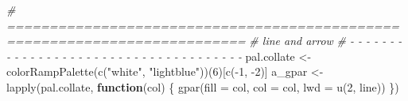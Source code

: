 \documentclass[
]{article}
\newenvironment{Shaded}{\begin{snugshade}}{\end{snugshade}}
\newcommand{\AttributeTok}[1]{\textcolor[rgb]{0.77,0.63,0.00}{#1}}
\newcommand{\CommentTok}[1]{\textcolor[rgb]{0.56,0.35,0.01}{\textit{#1}}}
\newcommand{\ControlFlowTok}[1]{\textcolor[rgb]{0.13,0.29,0.53}{\textbf{#1}}}
\newcommand{\DecValTok}[1]{\textcolor[rgb]{0.00,0.00,0.81}{#1}}
\newcommand{\FunctionTok}[1]{\textcolor[rgb]{0.00,0.00,0.00}{#1}}
\newcommand{\NormalTok}[1]{#1}
\newcommand{\OtherTok}[1]{\textcolor[rgb]{0.56,0.35,0.01}{#1}}
\newcommand{\SpecialCharTok}[1]{\textcolor[rgb]{0.00,0.00,0.00}{#1}}
\newcommand{\StringTok}[1]{\textcolor[rgb]{0.31,0.60,0.02}{#1}}
\begin{document}
\begin{Shaded}
\begin{Highlighting}[]
\CommentTok{\# ==========================================================================}
\CommentTok{\# line and arrow}
\CommentTok{\# {-} {-} {-} {-} {-} {-} {-} {-} {-} {-} {-} {-} {-} {-} {-} {-} {-} {-} {-} {-} {-} {-} {-} {-} {-} {-} {-} {-} {-} {-} {-} {-} {-} {-} {-} {-} {-}}
\NormalTok{pal.collate }\OtherTok{\textless{}{-}} \FunctionTok{colorRampPalette}\NormalTok{(}\FunctionTok{c}\NormalTok{(}\StringTok{"white"}\NormalTok{, }\StringTok{"lightblue"}\NormalTok{))(}\DecValTok{6}\NormalTok{)[}\FunctionTok{c}\NormalTok{(}\SpecialCharTok{{-}}\DecValTok{1}\NormalTok{, }\SpecialCharTok{{-}}\DecValTok{2}\NormalTok{)]}
\NormalTok{a\_gpar }\OtherTok{\textless{}{-}} 
  \FunctionTok{lapply}\NormalTok{(pal.collate,}
         \ControlFlowTok{function}\NormalTok{(col) \{}
           \FunctionTok{gpar}\NormalTok{(}\AttributeTok{fill =}\NormalTok{ col, }\AttributeTok{col =}\NormalTok{ col, }\AttributeTok{lwd =} \FunctionTok{u}\NormalTok{(}\DecValTok{2}\NormalTok{, line))}
\NormalTok{         \})}


\end{Highlighting}
\end{Shaded}
\end{document}
